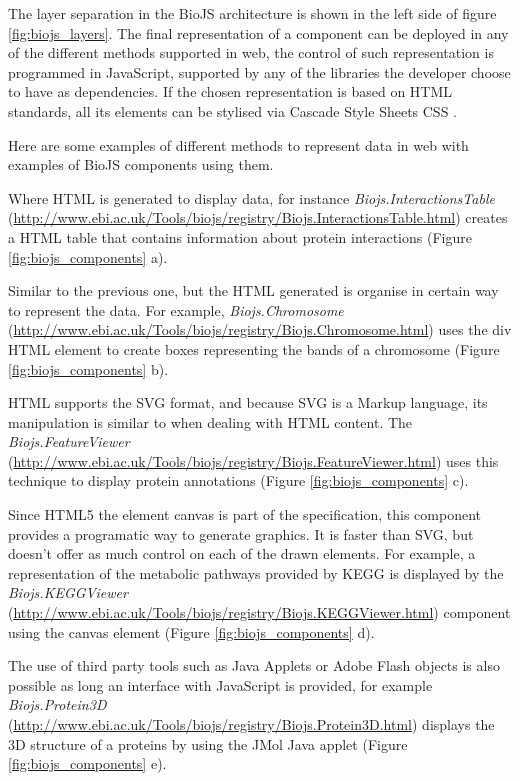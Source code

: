 The layer separation in the BioJS architecture is shown in the left side of figure \ref{fig:biojs_layers}. The final representation of a component can be deployed in any of the different methods supported in web, the control of such representation is programmed in JavaScript, supported by any of the libraries the developer choose to have as dependencies. If the chosen representation is based on HTML standards, all its elements can be stylised via Cascade Style Sheets CSS \cite{COR2014}.

Here are some examples of different methods to represent data in web with examples of BioJS components using them.
\begin{description}
\setlength\itemsep{-0.3em}
\item[HTML documents] Where HTML is generated to display data, for instance \emph{Biojs.InteractionsTable} (\url{http://www.ebi.ac.uk/Tools/biojs/registry/Biojs.InteractionsTable.html}) creates a HTML table that contains information about protein interactions (Figure \ref{fig:biojs_components} a).
\item[Visualizations using HTML elements] Similar to the previous one, but the HTML generated is organise in certain way to represent the data. For example,  \emph{Biojs.Chromosome} (\url{http://www.ebi.ac.uk/Tools/biojs/registry/Biojs.Chromosome.html}) uses the div HTML element to create boxes representing the bands of a chromosome (Figure \ref{fig:biojs_components} b).
\item[Scalable Vector Graphics] HTML supports the SVG format, and because SVG is a Markup language, its manipulation is similar to when dealing with HTML content. The \emph{Biojs.FeatureViewer} (\url{http://www.ebi.ac.uk/Tools/biojs/registry/Biojs.FeatureViewer.html}) uses this technique to display protein annotations (Figure \ref{fig:biojs_components} c).
\item[HTML canvas] Since HTML5 the element canvas is part of the specification, this component provides a programatic way to generate graphics. It is faster than SVG, but doesn't offer as much control on each of the drawn elements. For example, a representation of the metabolic pathways provided by KEGG is displayed by the \emph{Biojs.KEGGViewer} (\url{http://www.ebi.ac.uk/Tools/biojs/registry/Biojs.KEGGViewer.html}) component using the canvas element (Figure \ref{fig:biojs_components} d).
\item[Browser plugins] The use of third party tools such as Java Applets or Adobe Flash objects is also possible as long an interface with JavaScript is provided, for example \emph{Biojs.Protein3D} (\url{http://www.ebi.ac.uk/Tools/biojs/registry/Biojs.Protein3D.html}) displays the 3D structure of a proteins by using the JMol Java applet (Figure \ref{fig:biojs_components} e).
\end{description}

